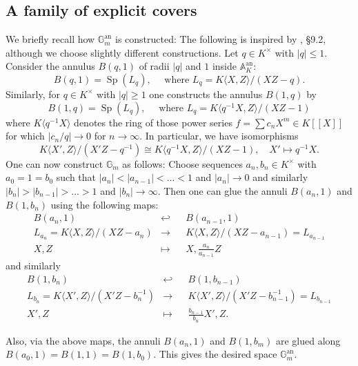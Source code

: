 \documentclass[11pt,oneside]{amsart}
\theoremstyle{definition}
\theoremstyle{remark}
\begin{document}
	\subsection{A family of explicit covers}
	We briefly recall how $\mathbb G_m^{\operatorname{an}}$ is constructed: The following is inspired by \cite{Bosch lectures}, \S 9.2, although we choose slightly different constructions. Let $q \in K^\times$ with $|q|\leq 1$. Consider the annulus $B(q,1)$ of radii $|q|$ and $1$ inside $\mathbb A_K^{\operatorname{an}}$:
	\[B(q,1) = \operatorname{Sp}(L_q),\quad \text{ where } L_q = K\langle X,Z\rangle/(XZ-q). \]
	Similarly, for $q\in K^\times$ with $|q|\geq 1$ one constructs the annulus $B(1,q)$ by
	\[B(1,q) = \operatorname{Sp}(L_{q}),\quad \text{ where } L_{q} = K\langle q^{-1}X,Z\rangle/(XZ-1)\]
	where $K\langle q^{-1}X\rangle$ denotes the ring of those power series $f=\sum c_nX^m\in K[[X]]$ for which $|c_n/q|\to 0$ for $n\to \infty$. In particular, we have isomorphisms
	 \[K\langle X',Z\rangle/(X'Z-q^{-1})\cong K\langle q^{-1}X,Z\rangle/(XZ-1),\quad X'\mapsto q^{-1}X.\]
	One can now construct $\mathbb G_m$ as follows: Choose sequences $a_n,b_n\in K^\times$ with $a_0=1=b_0$ such that $|a_n|<|a_{n-1}|<...<1$ and $|a_n| \to 0$ and similarly $|b_n|>|b_{n-1}|>...>1$ and $|b_n| \to \infty$. Then one can glue the annuli $B(a_n,1)$ and $B(1,b_n)$ using the following maps:
	\begin{equation}\label{torus explicit cover glue map 1}
	\begin{alignedat}{2}
	B(a_{n},1)&\hookleftarrow&& B(a_{n-1},1)\\
	L_{a_n}=K\langle X,Z\rangle/(XZ-a_n)&\rightarrow &&K\langle X,Z\rangle/(XZ-a_{n-1})=L_{a_{n-1}}\\
	X,Z&\mapsto&& X, \frac{a_{n}}{a_{n-1}}Z
	\end{alignedat}
	\end{equation}
	and similarly 
	\begin{equation}\label{torus explicit cover glue map 2}
	\begin{alignedat}{2}
	B(1,b_n)&\hookleftarrow&& B(1,b_{n-1})\\
	L_{b_n}=K\langle X',Z\rangle/(X'Z-b_{n}^{-1})&\rightarrow &&K\langle X',Z\rangle/(X'Z-b_{n-1}^{-1})=L_{b_{n-1}}\\
	X',Z&\mapsto&& \frac{b_{n-1}}{b_{n}} X', Z.
	\end{alignedat}
	\end{equation}
	
	Also, via the above maps, the annuli $B(a_n,1)$ and $B(1,b_m)$ are glued along $B(a_0,1)=B(1,1)=B(1,b_0).$ This gives the desired space $\mathbb{G}_m^{\operatorname{an}}$.
	
\end{document}

